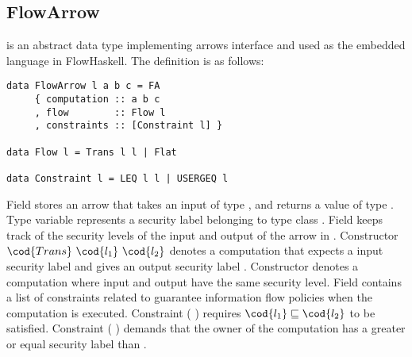 \subsection{FlowArrow}
\label{chap2:flowarrow}
 is an abstract data type implementing arrows interface and used
as the embedded language in FlowHaskell. The definition is as follows:
\begin{verbatim}
data FlowArrow l a b c = FA
     { computation :: a b c
     , flow        :: Flow l
     , constraints :: [Constraint l] }

data Flow l = Trans l l | Flat

data Constraint l = LEQ l l | USERGEQ l
\end{verbatim}
Field  stores an arrow that takes an input of type , and returns a
value of type . 
Type variable  represents a security label belonging to type class .
Field  keeps track of the security levels of the input and output of the arrow 
in . 
Constructor $\cod{Trans}~\cod{l_1}~\cod{l_2}$ denotes a computation that expects a input 
security label  and gives an output security label . Constructor
 denotes a computation where input and output have the same security level.
Field  contains a list of constraints related to guarantee information
flow policies when the computation is executed.
Constraint (  ) requires $\cod{l_1}\sqsubseteq\cod{l_2}$ to be satisfied.
Constraint ( ) demands that the owner of the computation has
a greater or equal security label than .

